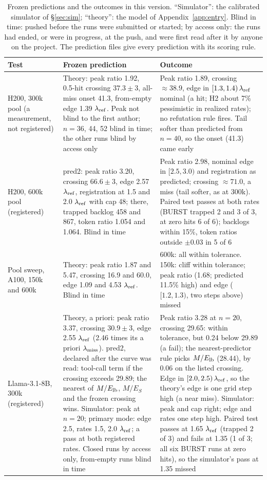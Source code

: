 \begin{table}[!tp]
\centering\footnotesize
\caption{Frozen predictions and the outcomes in this version. ``Simulator'': the calibrated simulator of \S\ref{sec:sim}; ``theory'': the model of Appendix~\ref{app:entry}. Blind in time: pushed before the runs were submitted or started; by access only: the runs had ended, or were in progress, at the push, and were first read after it by anyone on the project. The prediction files  give every prediction with its scoring rule.}\label{tab:frozensum}
\setlength{\tabcolsep}{3pt}
\begin{tabular}{@{}>{\raggedright\arraybackslash}p{3.0cm} >{\raggedright\arraybackslash}p{7.4cm} >{\raggedright\arraybackslash}p{6.5cm}@{}}
\toprule
Test & Frozen prediction & Outcome\\
\midrule
H200, 300k pool (a measurement, not registered) & Theory: peak ratio 1.92, 0.5-hit crossing $37.3\pm3$, all-miss onset 41.3, from-empty edge 1.39 $\lambda_{\mathrm{ref}}$. Peak not blind to the first author; $n=36$, 44, 52 blind in time; the other runs blind by access only & Peak ratio 1.89, crossing $\approx38.9$, edge in $[1.3,1.4)\,\lambda_{\mathrm{ref}}$ nominal (a hit; H2 about 7\% pessimistic in realized rates); no refutation rule fires. Tail softer than predicted from $n=40$, so the onset (41.3) came early\\
\addlinespace[0.3pt]
H200, 600k pool (registered) & pred2: peak ratio 3.20, crossing $66.6\pm3$, edge 2.57 $\lambda_{\mathrm{ref}}$, registration at 1.5 and 2.0 $\lambda_{\mathrm{ref}}$ with cap 48; there, trapped backlog 458 and 867, token ratio 1.054 and 1.064. Blind in time & Peak ratio 2.98, nominal edge in $[2.5,3.0)$ and registration as predicted; crossing $\approx71.0$, a miss (tail softer, as at 300k). Paired test passes at both rates (BURST trapped 2 and 3 of 3, at zero hits 6 of 6); backlogs within 15\%, token ratios outside $\pm0.03$ in 5 of 6\\
\addlinespace[0.3pt]
Pool sweep, A100, 150k and 600k & Theory: peak ratio 1.87 and 5.47, crossing 16.9 and 60.0, edge 1.09 and 4.53 $\lambda_{\mathrm{ref}}$. Blind in time & 600k: all within tolerance. 150k: cliff within tolerance; peak ratio (1.68; predicted 11.5\% high) and edge ($[1.2,1.3)$, two steps above) missed\\
\addlinespace[0.3pt]
Llama-3.1-8B, 300k (registered) & Theory, a priori: peak ratio 3.37, crossing $30.9\pm3$, edge 2.55 $\lambda_{\mathrm{ref}}$ (2.46 times its a priori $\lambda_{\mathrm{miss}}$). pred2, declared after the curve was read: tool-call term if the crossing exceeds 29.89; the nearest of $M/E_{\mathrm{lb}}$, $M/E_S$ and the frozen crossing wins. Simulator: peak at $n=20$; primary mode: edge 2.5, rates 1.5, 2.0 $\lambda_{\mathrm{ref}}$; a pass at both registered rates. Closed runs by access only, from-empty runs blind in time & Peak ratio 3.28 at $n=20$, crossing 29.65: within tolerance, but 0.24 below 29.89 (a fail); the nearest-predictor rule picks $M/E_{\mathrm{lb}}$ (28.44), by 0.06 on the listed crossing. Edge in $[2.0,2.5)\,\lambda_{\mathrm{ref}}$, so the theory's edge is one grid step high (a near miss). Simulator: peak and cap right; edge and rates one step high. Paired test passes at 1.65 $\lambda_{\mathrm{ref}}$ (trapped 2 of 3) and fails at 1.35 (1 of 3; all six BURST runs at zero hits), so the simulator's pass at 1.35 missed\\

\end{tabular}
\end{table}
